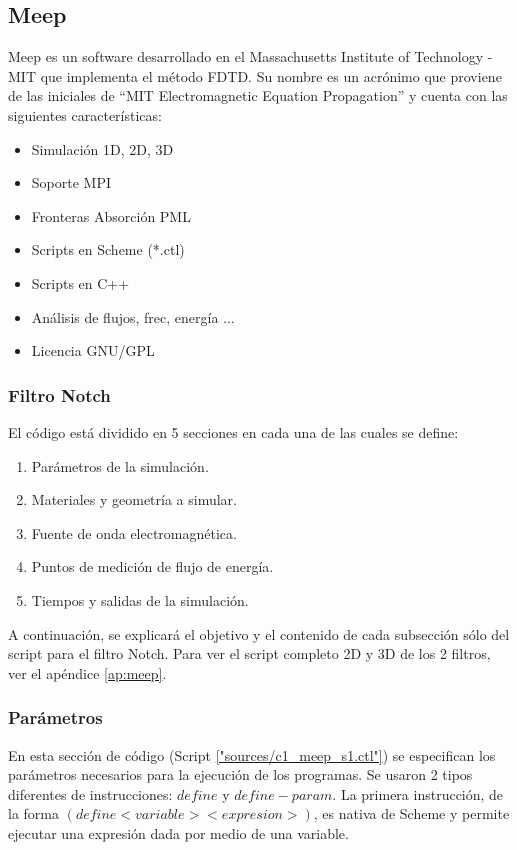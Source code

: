 \subsection{Meep}
\label{ss:c1_meep}

Meep es un software desarrollado en el Massachusetts Institute of Technology - MIT
que implementa el método FDTD. 
Su nombre es un acrónimo que proviene de las iniciales de 
“MIT Electromagnetic Equation Propagation” y cuenta con las siguientes características:

\begin{itemize}
\item Simulación 1D, 2D, 3D
\item Soporte MPI
\item Fronteras Absorción  PML 
\item Scripts  en Scheme (*.ctl)
\item Scripts en C++
\item Análisis de flujos, frec, energía ...
\item Licencia GNU/GPL
\end{itemize} 

\subsubsection{Filtro Notch}

El código está dividido en 5 secciones en cada una de las cuales se define: 
\begin{enumerate}
\item Parámetros de la simulación.
\item Materiales y geometría a simular.
\item Fuente de onda electromagnética.
\item Puntos de medición de flujo de energía.
\item Tiempos y salidas de la simulación.
\end{enumerate} 

A continuación, se explicará el objetivo y el contenido de cada subsección 
sólo del script para el filtro Notch. Para ver el script completo 2D y 3D
de los 2 filtros, ver el apéndice \ref{ap:meep}.

\subsubsection{Parámetros}
En esta sección de código (Script \ref{"sources/c1_meep_s1.ctl"}) 
se especifican los parámetros necesarios para la ejecución de los programas. 
Se usaron 2 tipos diferentes de instrucciones: $define$ y $define-param$. 
La primera instrucción, de la forma $(define <variable> <expresion>)$, es nativa de Scheme y permite 
ejecutar una expresión dada por medio de una variable. 

